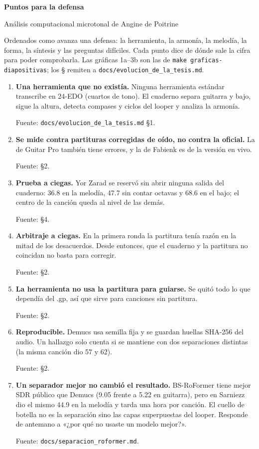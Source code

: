 \documentclass[11pt,a4paper]{article}
\newcommand{\fuente}[1]{\par{\small\color{gris}Fuente: #1}}
\newcommand{\seccion}[1]{\vspace{0.4cm}{\Large\color{azul}\textbf{#1}}\par\vspace{0.1cm}}
\begin{document}
{\LARGE\color{azul}\textbf{Puntos para la defensa}}\par
\vspace{0.1cm}
{\large Análisis computacional microtonal de Angine de Poitrine}\par
\vspace{0.3cm}
Ordenados como avanza una defensa: la herramienta, la armonía, la melodía, la forma, la síntesis y las preguntas
difíciles. Cada punto dice de dónde sale la cifra para poder comprobarla. Las gráficas 1a--3b son las de
\texttt{make graficas-diapositivas}; los § remiten a \texttt{docs/evolucion\_de\_la\_tesis.md}.

\seccion{1. La herramienta: por qué creerle}
\begin{enumerate}
\item \textbf{Una herramienta que no existía.} Ninguna herramienta estándar transcribe en 24-EDO (cuartos de tono).
  El cuaderno separa guitarra y bajo, sigue la altura, detecta compases y ciclos del looper y analiza la armonía.
  \fuente{\texttt{docs/evolucion\_de\_la\_tesis.md} §1.}
\item \textbf{Se mide contra partituras corregidas de oído, no contra la oficial.} La de Guitar Pro también tiene
  errores, y la de Fabienk es de la versión en vivo.
  \fuente{§2.}
\item \textbf{Prueba a ciegas.} Yor Zarad se reservó sin abrir ninguna salida del cuaderno: 36.8 en la melodía,
  47.7 sin contar octavas y 68.6 en el bajo; el centro de la canción queda al nivel de las demás.
  \fuente{§4.}
\item \textbf{Arbitraje a ciegas.} En la primera ronda la partitura tenía razón en la mitad de los desacuerdos.
  Desde entonces, que el cuaderno y la partitura no coincidan no basta para corregir.
  \fuente{§2.}
\item \textbf{La herramienta no usa la partitura para guiarse.} Se quitó todo lo que dependía del .gp, así que sirve
  para canciones sin partitura.
  \fuente{§2.}
\item \textbf{Reproducible.} Demucs usa semilla fija y se guardan huellas SHA-256 del audio. Un hallazgo solo cuenta
  si se mantiene con dos separaciones distintas (la misma canción dio 57 y 62).
  \fuente{§2.}
\item \textbf{Un separador mejor no cambió el resultado.} BS-RoFormer tiene mejor SDR público que Demucs (9.05 frente
  a 5.22 en guitarra), pero en Sarniezz dio el mismo 44.9 en la melodía y tarda una hora por canción. El cuello de
  botella no es la separación sino las capas superpuestas del looper. Responde de antemano a «¿por qué no usaste un
  modelo mejor?».
  \fuente{\texttt{docs/separacion\_roformer.md}.}
\end{enumerate}
\end{document}
